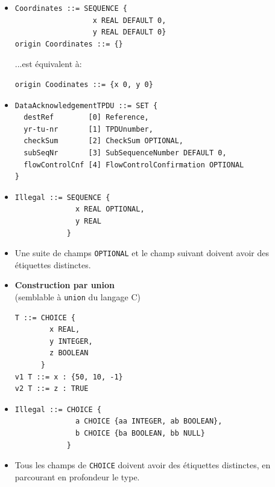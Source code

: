 \begin{slide}
\begin{itemize}
  \item
\begin{verbatim}
Coordinates ::= SEQUENCE {
                  x REAL DEFAULT 0,
                  y REAL DEFAULT 0}
origin Coordinates ::= {}
\end{verbatim}
...est équivalent à:
\begin{verbatim}
origin Coodinates ::= {x 0, y 0}
\end{verbatim}

  \item
\begin{verbatim}
DataAcknowledgementTPDU ::= SET {
  destRef        [0] Reference,
  yr-tu-nr       [1] TPDUnumber,
  checkSum       [2] CheckSum OPTIONAL,
  subSeqNr       [3] SubSequenceNumber DEFAULT 0,
  flowControlCnf [4] FlowControlConfirmation OPTIONAL
}
\end{verbatim}

\end{itemize}
\end{slide}

\begin{slide}
\begin{itemize}
  \item
\begin{verbatim}
Illegal ::= SEQUENCE {
              x REAL OPTIONAL,
              y REAL
            }
\end{verbatim}
  \item Une suite de champs {\tt OPTIONAL} et le champ suivant
        doivent avoir des étiquettes distinctes.
\end{itemize}
\end{slide}

\begin{slide}
\begin{itemize}
  \item {\bf Construction par union} \\
        (semblable à {\tt union} du langage C)
\begin{verbatim}
T ::= CHOICE {
        x REAL,
        y INTEGER,
        z BOOLEAN
      }
v1 T ::= x : {50, 10, -1}
v2 T ::= z : TRUE
\end{verbatim}

  \item
\begin{verbatim}
Illegal ::= CHOICE {
              a CHOICE {aa INTEGER, ab BOOLEAN},
              b CHOICE {ba BOOLEAN, bb NULL}
            }
\end{verbatim}

  \item Tous les champs de {\tt CHOICE} doivent avoir des étiquettes
        distinctes, en parcourant en profondeur le type.
\end{itemize}
\end{slide}


